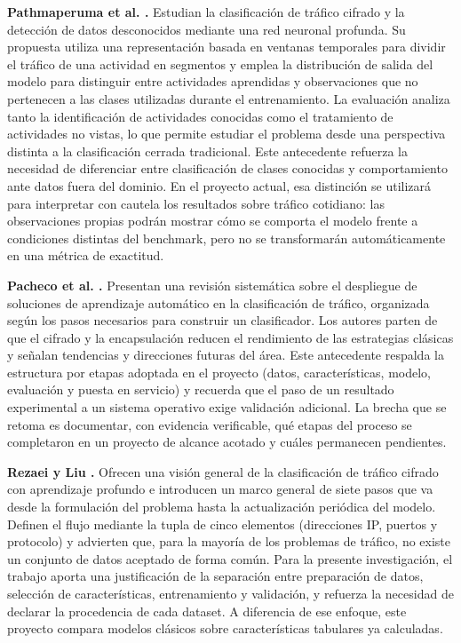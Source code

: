 \documentclass[conference]{IEEEtran}
\begin{document}
\textbf{Pathmaperuma et al. \cite{pathmaperuma2022}.} Estudian la clasificación de tráfico cifrado y la detección de datos desconocidos mediante una red neuronal profunda. Su propuesta utiliza una representación basada en ventanas temporales para dividir el tráfico de una actividad en segmentos y emplea la distribución de salida del modelo para distinguir entre actividades aprendidas y observaciones que no pertenecen a las clases utilizadas durante el entrenamiento. La evaluación analiza tanto la identificación de actividades conocidas como el tratamiento de actividades no vistas, lo que permite estudiar el problema desde una perspectiva distinta a la clasificación cerrada tradicional. Este antecedente refuerza la necesidad de diferenciar entre clasificación de clases conocidas y comportamiento ante datos fuera del dominio. En el proyecto actual, esa distinción se utilizará para interpretar con cautela los resultados sobre tráfico cotidiano: las observaciones propias podrán mostrar cómo se comporta el modelo frente a condiciones distintas del benchmark, pero no se transformarán automáticamente en una métrica de exactitud.

\textbf{Pacheco et al. \cite{pacheco2019}.} Presentan una revisión sistemática sobre el despliegue de soluciones de aprendizaje automático en la clasificación de tráfico, organizada según los pasos necesarios para construir un clasificador. Los autores parten de que el cifrado y la encapsulación reducen el rendimiento de las estrategias clásicas y señalan tendencias y direcciones futuras del área. Este antecedente respalda la estructura por etapas adoptada en el proyecto (datos, características, modelo, evaluación y puesta en servicio) y recuerda que el paso de un resultado experimental a un sistema operativo exige validación adicional. La brecha que se retoma es documentar, con evidencia verificable, qué etapas del proceso se completaron en un proyecto de alcance acotado y cuáles permanecen pendientes.

\textbf{Rezaei y Liu \cite{rezaei2019}.} Ofrecen una visión general de la clasificación de tráfico cifrado con aprendizaje profundo e introducen un marco general de siete pasos que va desde la formulación del problema hasta la actualización periódica del modelo. Definen el flujo mediante la tupla de cinco elementos (direcciones IP, puertos y protocolo) y advierten que, para la mayoría de los problemas de tráfico, no existe un conjunto de datos aceptado de forma común. Para la presente investigación, el trabajo aporta una justificación de la separación entre preparación de datos, selección de características, entrenamiento y validación, y refuerza la necesidad de declarar la procedencia de cada dataset. A diferencia de ese enfoque, este proyecto compara modelos clásicos sobre características tabulares ya calculadas.
\end{document}
